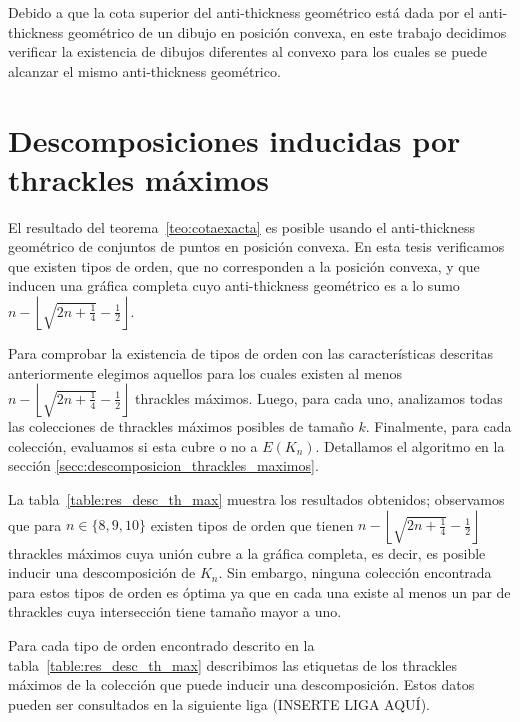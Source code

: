   Debido a que la cota superior del anti-thickness geométrico está dada por
  el anti-thickness geométrico de un dibujo en posición convexa, en este trabajo
  decidimos verificar la existencia de dibujos diferentes al convexo para los
  cuales se puede alcanzar el mismo anti-thickness geométrico.

\section{Descomposiciones inducidas por thrackles máximos}

  El resultado del teorema~\ref{teo:cotaexacta} es posible usando el anti-thickness
  geométrico de conjuntos de puntos en posición convexa. En esta tesis verificamos
  que existen tipos de orden, que no corresponden a la posición convexa, y que
  inducen una gráfica completa cuyo anti-thickness geométrico es
  a lo sumo $n - \left\lfloor\sqrt{2n+\frac{1}{4}} - \frac{1}{2}\right\rfloor$.

  Para comprobar la existencia de tipos de orden con las características descritas
  anteriormente elegimos aquellos para los cuales existen al menos $n -
  \left\lfloor\sqrt{2n+\frac{1}{4}} - \frac{1}{2}\right\rfloor$ thrackles
  máximos. Luego, para cada uno, analizamos todas las colecciones de thrackles
  máximos posibles de tamaño $k$. Finalmente, para cada colección, evaluamos si
  esta cubre o no a $E(K_n)$. Detallamos el algoritmo en la sección
  \ref{secc:descomposicion_thrackles_maximos}.

  La tabla~\ref{table:res_desc_th_max} muestra los resultados obtenidos;
  observamos que para $n\in \{8,9,10\}$ existen tipos de orden que tienen $ n -
  \left\lfloor\sqrt{2n+\frac{1}{4}} - \frac{1}{2}\right\rfloor$
  thrackles máximos cuya unión cubre a la gráfica completa, es decir, es posible
  inducir una descomposición de $K_n$. Sin embargo, ninguna colección
  encontrada para estos tipos de orden es óptima ya que en cada
  una existe al menos un par de thrackles cuya intersección tiene tamaño mayor a uno.


  Para cada tipo de orden encontrado descrito en la
  tabla~\ref{table:res_desc_th_max} describimos las etiquetas de los thrackles
  máximos de la colección que puede inducir una descomposición. Estos datos
  pueden ser consultados en la siguiente liga (INSERTE LIGA AQUÍ).


